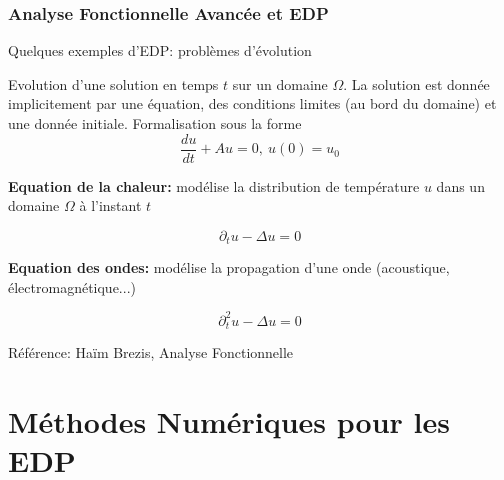 \documentclass{beamer}
\begin{document}
\begin{frame}\frametitle{Analyse Fonctionnelle Avancée et EDP}

  \begin{block}{Quelques exemples d'EDP: probl\`emes d'\'evolution}

Evolution d'une solution en temps $t$ sur un domaine $\Omega$. La solution est donn\'ee implicitement par une \'equation, des conditions limites (au bord du domaine)
et une donn\'ee initiale. Formalisation sous la forme
$$
\frac{d u}{dt}+Au = 0,\ u(0) = u_0
$$

{\bf Equation de la chaleur:} mod\'elise la distribution de temp\'erature $u$ dans un domaine $\Omega$ \`a l'instant $t$

$$
\partial_t u -\Delta u = 0
$$

{\bf Equation des ondes:} mod\'elise %
la propagation d'une onde (acoustique, \'electromagn\'etique...)

$$
\partial_t^2u-\Delta u = 0
$$

R\'ef\'erence: Ha\"im Brezis, Analyse Fonctionnelle

  \end{block}


\end{frame}


\section{Méthodes Numériques pour les EDP}
\end{document}
